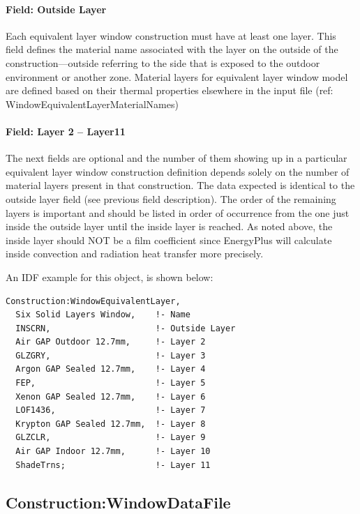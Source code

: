\paragraph{Field: Outside Layer}\label{field-outside-layer-2}

Each equivalent layer window construction must have at least one layer. This field defines the material name associated with the layer on the outside of the construction---outside referring to the side that is exposed to the outdoor environment or another zone. Material layers for equivalent layer window model are defined based on their thermal properties elsewhere in the input file (ref: WindowEquivalentLayerMaterialNames)

\paragraph{Field: Layer 2 -- Layer11}\label{field-layer-2---layer11}

The next fields are optional and the number of them showing up in a particular equivalent layer window construction definition depends solely on the number of material layers present in that construction. The data expected is identical to the outside layer field (see previous field description). The order of the remaining layers is important and should be listed in order of occurrence from the one just inside the outside layer until the inside layer is reached. As noted above, the inside layer should NOT be a film coefficient since EnergyPlus will calculate inside convection and radiation heat transfer more precisely.

An IDF example for this object, is shown below:

\begin{lstlisting}
Construction:WindowEquivalentLayer,
  Six Solid Layers Window,    !- Name
  INSCRN,                     !- Outside Layer
  Air GAP Outdoor 12.7mm,     !- Layer 2
  GLZGRY,                     !- Layer 3
  Argon GAP Sealed 12.7mm,    !- Layer 4
  FEP,                        !- Layer 5
  Xenon GAP Sealed 12.7mm,    !- Layer 6
  LOF1436,                    !- Layer 7
  Krypton GAP Sealed 12.7mm,  !- Layer 8
  GLZCLR,                     !- Layer 9
  Air GAP Indoor 12.7mm,      !- Layer 10
  ShadeTrns;                  !- Layer 11
\end{lstlisting}

\subsection{Construction:WindowDataFile}\label{constructionwindowdatafile}

